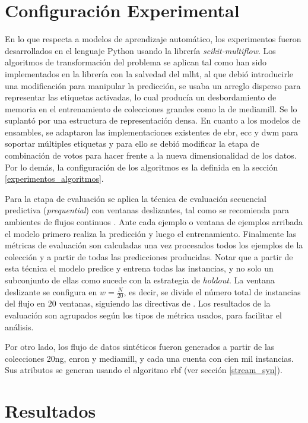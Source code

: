 \section{Configuración Experimental}

En lo que respecta a modelos de aprendizaje automático, los experimentos fueron
desarrollados en el lenguaje Python usando la librería
\textit{scikit-multiflow}. Los algoritmos de transformación del problema se
aplican tal como han sido implementados en la librería con la salvedad del
\acrshort{mlht}, al que debió introducirle una modificación para manipular la
predicción, se usaba un arreglo disperso para representar las etiquetas
activadas, lo cual producía un desbordamiento de memoria en el entrenamiento de
colecciones grandes como la de mediamill. Se lo suplantó por una estructura de
representación densa. En cuanto a los modelos de ensambles, se adaptaron las
implementaciones existentes de \acrshort{ebr}, \acrshort{ecc} y \acrshort{dwm}
para soportar múltiples etiquetas y para ello se debió modificar la etapa de
combinación de votos para hacer frente a la nueva dimensionalidad de los datos.
Por lo demás, la configuración de los algoritmos es la definida en la sección
\ref{experimentos_algoritmos}.

Para la etapa de evaluación se aplica la técnica de evaluación secuencial
predictiva (\textit{prequential}) con ventanas deslizantes, tal como se
recomienda para ambientes de flujos continuos \cite{gama_evaluating_2013}. Ante
cada ejemplo o ventana de ejemplos arribada el modelo primero realiza la
predicción y luego el entrenamiento. Finalmente las métricas de evaluación son
calculadas una vez procesados todos los ejemplos de la colección y a partir de
todas las predicciones producidas.  Notar que a partir de esta técnica el modelo
predice y entrena todas las instancias, y no solo un subconjunto de ellas como
sucede con la estrategia de \textit{holdout}. La ventana deslizante se configura
en $w = \frac{N}{20}$, es decir, se divide el número total de instancias del
flujo en 20 ventanas, siguiendo las directivas de \textcite{read_scalable_2012}.
Los resultados de la evaluación son agrupados según los tipos de métrica usados,
para facilitar el análisis.

Por otro lado, los flujo de datos sintéticos fueron generados a partir de las
colecciones 20ng, enron y mediamill, y cada una cuenta con cien mil instancias.
Sus atributos se generan usando el algoritmo \acrfull{rbf} (ver sección
\ref{stream_syn}).

\section{Resultados}
